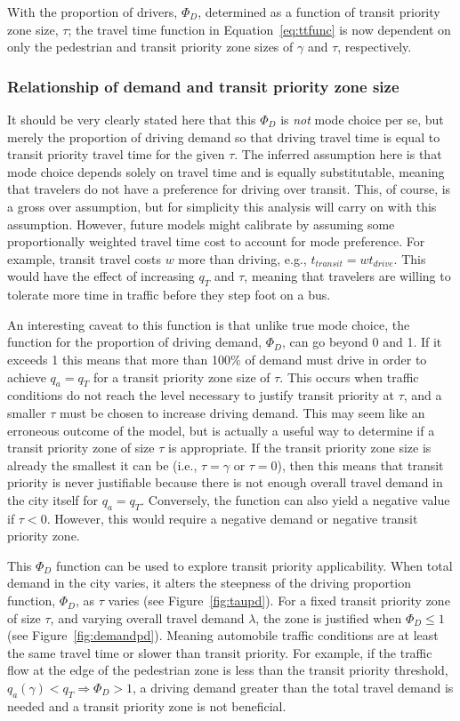 \documentclass{elsarticle}\usepackage[]{graphicx}\usepackage[]{color}
\begin{document}
\noindent With the proportion of drivers, $\Phi_D$, determined as a function of transit priority zone size, $\tau$; the travel time function in Equation~\eqref{eq:ttfunc} is now dependent on only the pedestrian and transit priority zone sizes of $\gamma$ and $\tau$, respectively.

\subsubsection{Relationship of demand and transit priority zone size}
It should be very clearly stated here that this $\Phi_D$ is \emph{not} mode choice per se, but merely the proportion of driving demand so that driving travel time is equal to transit priority travel time for the given $\tau$. The inferred assumption here is that mode choice depends solely on travel time and is equally substitutable, meaning that travelers do not have a preference for driving over transit. This, of course, is a gross over assumption, but for simplicity this analysis will carry on with this assumption. However, future models might calibrate by assuming some proportionally weighted travel time cost to account for mode preference. For example, transit travel costs $w$ more than driving, e.g., $t_{transit} = w t_{drive}$. This would have the effect of increasing $q_T$ and $\tau$, meaning that travelers are willing to tolerate more time in traffic before they step foot on a bus.

An interesting caveat to this function is that unlike true mode choice, the function for the proportion of driving demand, $\Phi_D$, can go beyond 0 and 1. If it exceeds 1 this means that more than 100\% of demand must drive in order to achieve $q_a = q_T$ for a transit priority zone size of $\tau$. This occurs when traffic conditions do not reach the level necessary to justify transit priority at $\tau$, and a smaller $\tau$ must be chosen to increase driving demand. This may seem like an erroneous outcome of the model, but is actually a useful way to determine if a transit priority zone of size $\tau$ is appropriate. If the transit priority zone size is already the smallest it can be (i.e., $\tau = \gamma$ or $\tau = 0$), then this means that transit priority is never justifiable because there is not enough overall travel demand in the city itself for $q_a = q_T$. Conversely, the function can also yield a negative value if $\tau < 0$. However, this would require a negative demand or negative transit priority zone.

This $\Phi_D$ function can be used to explore transit priority applicability. When total demand in the city varies, it alters the steepness of the driving proportion function, $\Phi_D$, as $\tau$ varies (see Figure~\ref{fig:taupd}). For a fixed transit priority zone of size $\tau$, and varying overall travel demand $\lambda$, the zone is justified when $\Phi_D \leq 1$ (see Figure~\ref{fig:demandpd}). Meaning automobile traffic conditions are at least the same travel time or slower than transit priority. For example, if the traffic flow at the edge of the pedestrian zone is less than the transit priority threshold, $q_a(\gamma) < q_T \Rightarrow \Phi_D > 1$, a driving demand greater than the total travel demand is needed and a transit priority zone is not beneficial.
\end{document}
